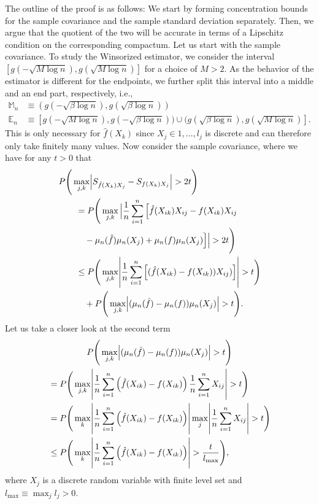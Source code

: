 The outline of the proof is as follows: We start by forming concentration bounds for the sample covariance and the sample standard deviation separately. Then, we argue that the quotient of the two will be accurate in terms of a Lipschitz condition on the corresponding compactum. Let us start with the sample covariance. To study the Winsorized estimator, we consider the interval $[g(-\sqrt{M\log n}), g(\sqrt{M\log n})]$ for a choice of $M>2$. As the behavior of the estimator is different for the endpoints, we further split this interval into a middle and an end part, respectively, i.e.,
\begin{equation*}
    \begin{split}
        \mathbb{M}_n &\equiv (g(-\sqrt{\beta\log n}), g(\sqrt{\beta\log n})) \\
        \mathbb{E}_n &\equiv [g(-\sqrt{M\log n}), g(-\sqrt{\beta\log n})) \cup (g(\sqrt{\beta\log n}), g(\sqrt{M\log n})].
    \end{split}
\end{equation*}
This is only necessary for $\hat{f}(X_k)$ since $X_j \in 1, \dots, l_{j}$ is discrete and can therefore only take finitely many values. Now consider the sample covariance, where we have for any $t > 0$ that
\begin{align*}
    \MoveEqLeft P\Bigg(\max_{j,k} \abs{S_{\hat{f}(X_k)X_j} - S_{f(X_k)X_j}} > 2t \Bigg)                              \\
     & = P\Bigg(\max_{j,k} \Big\lvert\frac{1}{n}\sum_{i=1}^n \Big[\hat{f}(X_{ik})X_{ij} - f(X_{ik})X_{ij}            \\
     & \quad - \mu_n(\hat{f})\mu_n(X_j) + \mu_n(f)\mu_n(X_j)\Big]\Big\rvert > 2t \Bigg)                              \\
     & \leq P\Bigg(\max_{j,k}\abs{\frac{1}{n}\sum_{i=1}^n \Big[(\hat{f}(X_{ik}) - f(X_{ik}))X_{ij})\Big]} > t \Bigg) \\
     & \quad + P\Bigg(\max_{j,k}\abs{(\mu_n(\hat{f}) - \mu_n(f))\mu_n(X_j)} > t \Bigg).
\end{align*}
Let us take a closer look at the second term
\begin{multline*}
    P\Bigg(\max_{j,k}\abs{(\mu_n(\hat{f}) - \mu_n(f))\mu_n(X_j)} > t \Bigg) \\
    \begin{aligned}
         & = P\Bigg(\max_{j,k}\abs{ \frac{1}{n}\sum_{i=1}^n \left(\hat{f}(X_{ik}) - f(X_{ik})\right) \frac{1}{n}\sum_{i=1}^n X_{ij} } > t \Bigg)              \\
         & = P\Bigg(\max_{k}\abs{ \frac{1}{n}\sum_{i=1}^n \left(\hat{f}(X_{ik}) - f(X_{ik})\right)} \max_{j} \abs{\frac{1}{n}\sum_{i=1}^n X_{ij}}  > t \Bigg) \\
         & \leq P\Bigg(\max_{k}\abs{ \frac{1}{n}\sum_{i=1}^n \left(\hat{f}(X_{ik}) - f(X_{ik})\right)} > \frac{t}{l_{\max}} \Bigg),
    \end{aligned}
\end{multline*}
where $X_j$ is a discrete random variable with finite level set and $l_{\max} \equiv \max_j l_{j} > 0$.

